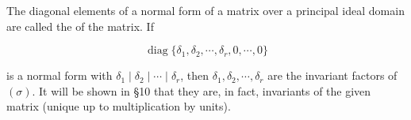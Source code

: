 The diagonal elements of a normal form of a matrix over a principal ideal domain are called the  of the matrix. If

$$\operatorname{diag}\{\delta_1, \delta_2, \cdots, \delta_r, 0, \cdots, 0\}$$

is a normal form with $\delta_1 \mid \delta_2 \mid \cdots \mid \delta_r$, then $\delta_1, \delta_2, \cdots, \delta_r$ are the invariant factors of $(\sigma)$. It will be shown in \S 10 that they are, in fact, invariants of the given matrix (unique up to multiplication by units).
